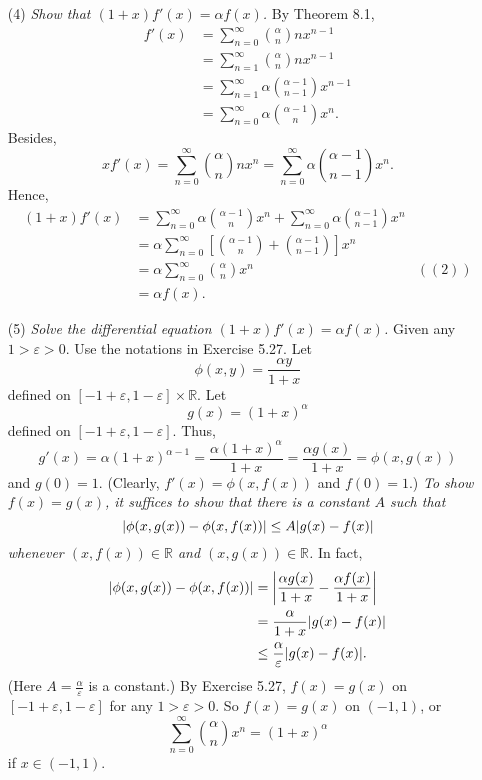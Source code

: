 \documentclass{article}
\begin{document}
\begin{enumerate}
\item[(4)]
\emph{Show that $(1+x)f'(x) = \alpha f(x)$.}
By Theorem 8.1,
\begin{align*}
  f'(x)
  &= \sum_{n=0}^{\infty} {\alpha \choose n} n x^{n-1} \\
  &= \sum_{n=1}^{\infty} {\alpha \choose n} n x^{n-1} \\
  &= \sum_{n=1}^{\infty} \alpha {\alpha-1 \choose n-1} x^{n-1} \\
  &= \sum_{n=0}^{\infty} \alpha {\alpha-1 \choose n} x^{n}.
\end{align*}
Besides,
\[
  x f'(x)
  = \sum_{n=0}^{\infty} {\alpha \choose n} n x^{n}
  = \sum_{n=0}^{\infty} \alpha {\alpha-1 \choose n-1} x^{n}.
\]
Hence,
\begin{align*}
  (1+x)f'(x)
  &= \sum_{n=0}^{\infty} \alpha {\alpha-1 \choose n} x^{n}
    + \sum_{n=0}^{\infty} \alpha {\alpha-1 \choose n-1} x^{n} \\
  &= \alpha \sum_{n=0}^{\infty} \left[ {\alpha-1 \choose n}+{\alpha-1 \choose n-1} \right] x^{n} \\
  &= \alpha \sum_{n=0}^{\infty} {\alpha \choose n} x^{n}
    &((2)) \\
  &= \alpha f(x).
\end{align*}

\item[(5)]
\emph{Solve the differential equation $(1+x)f'(x) = \alpha f(x)$.}
Given any $1 > \varepsilon > 0$.
Use the notations in Exercise 5.27.
Let
\[
  \phi(x,y) = \frac{\alpha y}{1+x}
\]
defined on $[-1+\varepsilon,1-\varepsilon] \times \mathbb{R}$.
Let
\[
  g(x) = (1+x)^\alpha
\]
defined on $[-1+\varepsilon,1-\varepsilon]$.
Thus,
\[
  g'(x)
  = \alpha (1+x)^{\alpha-1}
  = \frac{\alpha (1+x)^\alpha}{1+x}
  = \frac{\alpha g(x)}{1+x}
  = \phi(x,g(x))
\]
and $g(0) = 1$.
(Clearly, $f'(x) = \phi(x,f(x))$ and $f(0)=1$.)
\emph{To show $f(x) = g(x)$, it suffices to show that
there is a constant $A$ such that
\[
  \abs{\phi(x,g(x)) - \phi(x,f(x))} \leq A \abs{g(x) - f(x)}
\]
whenever $(x,f(x)) \in \mathbb{R}$ and $(x,g(x)) \in \mathbb{R}$.}
In fact,
\begin{align*}
  \abs{\phi(x,g(x)) - \phi(x,f(x))}
  &= \abs{\frac{\alpha g(x)}{1+x} - \frac{\alpha f(x)}{1+x}} \\
  &= \frac{\alpha}{1+x} \abs{g(x)-f(x)} \\
  &\leq \frac{\alpha}{\varepsilon} \abs{g(x)-f(x)}.
\end{align*}
(Here $A = \frac{\alpha}{\varepsilon}$ is a constant.)
By Exercise 5.27,
$f(x) = g(x)$ on $[-1+\varepsilon,1-\varepsilon]$ for any $1 > \varepsilon > 0$.
So
$f(x) = g(x)$ on $(-1,1)$,
or
\[
  \sum_{n=0}^{\infty} {\alpha \choose n} x^n = (1+x)^\alpha
\]
if $x \in (-1,1)$.


\end{enumerate}
\end{document}
